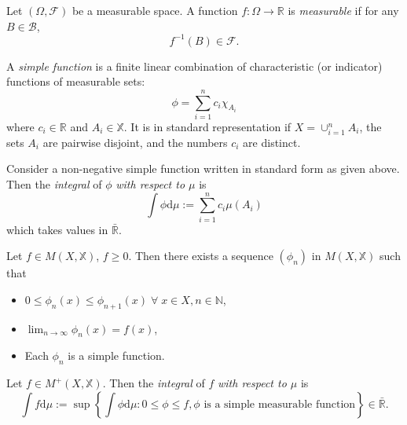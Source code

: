 \begin{definition}
    Let $(\Omega,\mathcal{F})$ be a measurable space. A function $f:\Omega\rightarrow\mathbb{R}$
    is \emph{measurable} if for any $B\in\mathcal{B}$,
    \begin{equation*}
        f^{-1}(B)\in\mathcal{F}.
    \end{equation*}
\end{definition}

\begin{definition}
    A \emph{simple function} is a finite linear combination of 
    characteristic (or indicator) functions of measurable sets:
    \begin{equation*}
        \phi=\sum_{i=1}^nc_i\chi_{A_i}
    \end{equation*}
    where $c_i\in\mathbb{R}$ and $A_i\in\mathbb{X}$.
    It is in standard representation if $X=\cup_{i=1}^nA_i$,
    the sets $A_i$ are pairwise disjoint, and the numbers $c_i$
    are distinct.
\end{definition}

\begin{definition}
    Consider a non-negative simple function written in standard form as given above.
    Then the \emph{integral} of $\phi$ \emph{with respect to $\mu$} is
    \begin{equation*}
        \int\phi\mathrm d\mu:=\sum_{i=1}^nc_i\mu(A_i)
    \end{equation*}
    which takes values in $\bar{\mathbb{R}}$.
\end{definition}

\begin{lemma}
    Let $f\in M(X,\mathbb{X})$, $f\geq0.$ Then there exists a sequence
    $(\phi_n)$ in $M(X,\mathbb{X})$ such that
    \begin{itemize}
        \item $0\leq\phi_n(x)\leq\phi_{n+1}(x)\;\forall\;x\in X,n\in\mathbb{N}$,
        \item $\lim_{n\rightarrow\infty}\phi_n(x)=f(x)$,
        \item Each $\phi_n$ is a simple function.
    \end{itemize}
\end{lemma}

\begin{definition}
    Let $f\in M^+(X,\mathbb{X})$. Then the \emph{integral} of $f$ 
    \emph{with respect to $\mu$} is 
    \begin{equation*}
        \int f\mathrm d\mu := \sup\left\{\int\phi\mathrm d\mu : 0\leq\phi\leq f, \phi\textrm{ is a simple measurable function}\right\}\in\bar{\mathbb{R}}.
    \end{equation*}
\end{definition}

